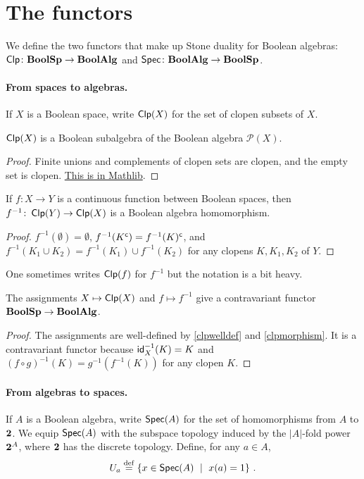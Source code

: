 \documentclass[a4paper,10pt]{article}
\numberwithin{theorem}{section}
\begin{document}
\section{The functors}
We define the two functors that make up Stone duality for Boolean algebras:
$\operatorname*{\mathsf{Clp}} \colon \mathbf{BoolSp} \to \mathbf{BoolAlg}$ and $\operatorname*{\mathsf{Spec}} \colon \mathbf{BoolAlg} \to \mathbf{BoolSp}$.

\paragraph{From spaces to algebras.}
If $X$ is a Boolean space, write $\operatorname*{\mathsf{Clp}}(X)$ for the set of clopen
subsets of $X$. 

\begin{proposition}\label{clpwelldef}
    $\operatorname*{\mathsf{Clp}}(X)$ is a Boolean subalgebra of the Boolean algebra $\mathcal{P}(X)$.
\end{proposition}
\begin{proof}
Finite unions and complements of clopen sets are clopen, and the empty set is
clopen.
\href{https://leanprover-community.github.io/mathlib4_docs/Mathlib/Topology/Sets/Closeds.html#TopologicalSpace.Clopens.instBooleanAlgebraClopens}{This
is in Mathlib}.
\end{proof} 
\begin{proposition}\label{clpmorphism}
    If $f \colon X \to Y$ is a
continuous function between Boolean spaces, then $f^{-1} \colon \operatorname*{\mathsf{Clp}}(Y) \to \operatorname*{\mathsf{Clp}}(X)$ is a Boolean
algebra homomorphism.
\end{proposition}
\begin{proof}
    $f^{-1}(\emptyset) = \emptyset$, $f^{-1}(K^{\mathsf{c}}) =
f^{-1}(K)^{\mathsf{c}}$, and $f^{-1}(K_1 \cup K_2) = f^{-1}(K_1) \cup f^{-1}(K_2)$ for
any clopens $K, K_1, K_2$ of $Y$. 
\end{proof}
One sometimes writes $\operatorname*{\mathsf{Clp}}(f)$ for
$f^{-1}$ but the notation is a bit heavy.

\begin{proposition}
    The assignments $X \mapsto \operatorname*{\mathsf{Clp}}(X)$ and $f \mapsto f^{-1}$ give a
contravariant functor $\mathbf{BoolSp} \to \mathbf{BoolAlg}$.
\end{proposition}
\begin{proof}
    The assignments are well-defined by \cref{clpwelldef} and
    \cref{clpmorphism}.
It is a contravariant functor because $\mathsf{id}_X^{-1}(K) = K$ and $(f
\circ g)^{-1}(K) = g^{-1}(f^{-1}(K))$ for any clopen $K$.
\end{proof}

\paragraph{From algebras to spaces.}
If $A$ is a Boolean algebra, write
$\operatorname*{\mathsf{Spec}}(A)$ for the set of homomorphisms from $A$ to $\mathbf{2}$. 
We equip $\operatorname*{\mathsf{Spec}}(A)$ with the subspace topology induced by the $|A|$-fold power
$\mathbf{2}^{A}$, where $\mathbf{2}$ has the discrete topology.
Define, for any $a \in A$,
\[ U_a \stackrel{\mathrm{def}}{=} \{ x \in \operatorname*{\mathsf{Spec}}(A) \ \mid \ x(a) = 1 \} \ . \]
\end{document}
